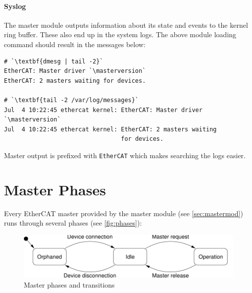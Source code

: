 \documentclass[a4paper,12pt,BCOR6mm,bibtotoc,idxtotoc]{scrbook}
\newcommand{\masterversion}{1.5.2}
\begin{document}
\paragraph{Syslog}

The master module outputs information about its state and events to the kernel
ring buffer. These also end up in the system logs. The above module loading
command should result in the messages below:

\begin{lstlisting}
# `\textbf{dmesg | tail -2}`
EtherCAT: Master driver `\masterversion`
EtherCAT: 2 masters waiting for devices.

# `\textbf{tail -2 /var/log/messages}`
Jul  4 10:22:45 ethercat kernel: EtherCAT: Master driver `\masterversion`
Jul  4 10:22:45 ethercat kernel: EtherCAT: 2 masters waiting
                                 for devices.
\end{lstlisting}

Master output is prefixed with \lstinline+EtherCAT+ which makes searching the
logs easier.


\section{Master Phases}

Every EtherCAT master provided by the master module (see
\autoref{sec:mastermod}) runs through several phases (see
\autoref{fig:phases}):

\begin{figure}[htbp]
  \centering
  \includegraphics[width=.9\textwidth]{images/phases}
  \caption{Master phases and transitions}
  \label{fig:phases}
\end{figure}
\end{document}
